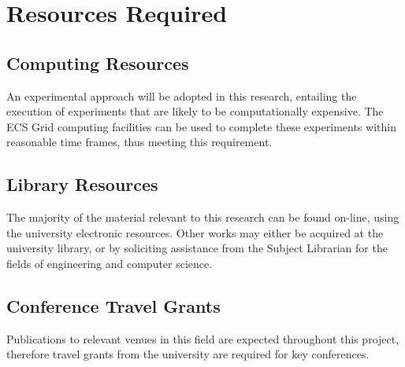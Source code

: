 \section{Resources Required}
\subsection{Computing Resources}
An experimental approach will be adopted in this research, entailing the execution of experiments that are likely to be computationally expensive. The ECS Grid computing facilities
can be used to complete these experiments within reasonable time frames, thus meeting this requirement.
\subsection{Library Resources}
The majority of the material relevant to this research can be found on-line, using the university electronic resources. Other works may either be acquired at the university library, or
by soliciting assistance from the Subject Librarian for the fields of engineering and computer science.
\subsection{Conference Travel Grants}
Publications to relevant venues in this field are expected throughout this project, therefore
travel grants from the university are required for key conferences.